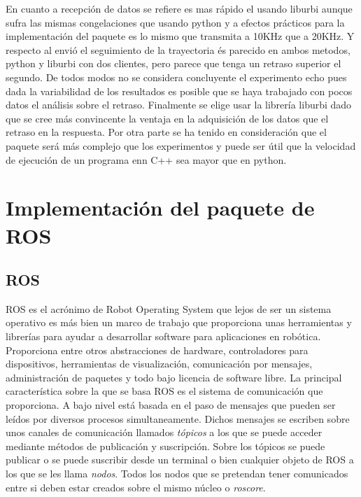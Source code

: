 \documentclass[12pt,a4paper,final,twoside]{book}
\begin{document}
En cuanto a recepción de datos se refiere es mas rápido el usando liburbi aunque sufra las mismas congelaciones que usando python y a efectos prácticos para la implementación del paquete es lo mismo que transmita a 10KHz que a 20KHz. Y respecto al envió el seguimiento de la trayectoria és parecido en ambos metodos, python y liburbi con dos clientes, pero parece que tenga un retraso superior el segundo. De todos modos no se considera concluyente el experimento echo pues dada la variabilidad de los resultados es posible que se haya trabajado con pocos datos el análisis sobre el retraso. Finalmente se elige usar la librería liburbi dado que se cree más convincente la ventaja en la adquisición de los datos que el retraso en la respuesta. Por otra parte se ha tenido en consideración que el paquete será más complejo que los experimentos y puede ser útil que la velocidad de ejecución de un programa enn C++ sea mayor que en python.

\newpage
\section{Implementación del paquete de ROS}
\subsection{ROS}
\label{ros}
ROS es el acrónimo de Robot Operating System que lejos de ser un sistema operativo es más bien un marco de trabajo que proporciona unas herramientas y librerías para ayudar a desarrollar software para aplicaciones en robótica. Proporciona entre otros abstracciones de hardware, controladores para dispositivos, herramientas de visualización, comunicación por mensajes, administración de paquetes y todo bajo licencia de software libre.
La principal característica sobre la que se basa ROS es el sistema de comunicación que proporciona. A bajo nivel está basada en el paso de mensajes que pueden ser leídos por diversos procesos simultaneamente. Dichos mensajes se escriben sobre unos canales de comunicación llamados \textit{tópicos} a los que se puede acceder mediante métodos de publicación y suscripción. Sobre los tópicos se puede publicar o se puede suscribir desde un terminal o bien cualquier objeto de ROS a los que se les llama \textit{nodos}. Todos los nodos que se pretendan tener comunicados entre si deben estar creados sobre el mismo núcleo o \textit{roscore}.
\end{document}
